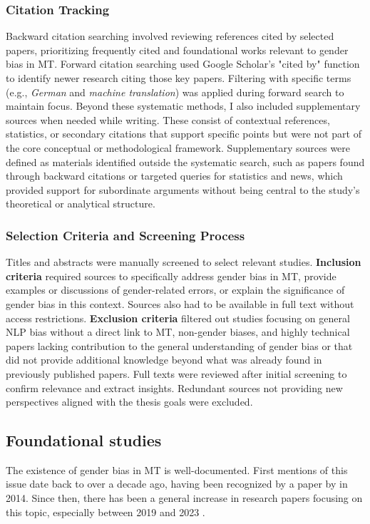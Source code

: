         \subsubsection{Citation Tracking}
        Backward citation searching involved reviewing references cited by selected papers, prioritizing frequently cited and foundational works relevant to gender bias in MT. Forward citation searching used Google Scholar's "cited by" function to identify newer research citing those key papers. Filtering with specific terms (e.g., \textit{German} and \textit{machine translation}) was applied during forward search to maintain focus. Beyond these systematic methods, I also included supplementary sources when needed while writing. These consist of contextual references, statistics, or secondary citations that support specific points but were not part of the core conceptual or methodological framework. Supplementary sources were defined as materials identified outside the systematic search, such as papers found through backward citations or targeted queries for statistics and news, which provided support for subordinate arguments without being central to the study's theoretical or analytical structure.

        \subsubsection{Selection Criteria and Screening Process}\label{subsection:selection_criteria}
        Titles and abstracts were manually screened to select relevant studies. \textbf{Inclusion criteria} required sources to specifically address gender bias in MT, provide examples or discussions of gender-related errors, or explain the significance of gender bias in this context. Sources also had to be available in full text without access restrictions. \textbf{Exclusion criteria} filtered out studies focusing on general NLP bias without a direct link to MT, non-gender biases, and highly technical papers lacking contribution to the general understanding of gender bias or that did not provide additional knowledge beyond what was already found in previously published papers. Full texts were reviewed after initial screening to confirm relevance and extract insights. Redundant sources not providing new perspectives aligned with the thesis goals were excluded.

    \subsection{Foundational studies}
        The existence of gender bias in MT is well-documented. First mentions of this issue date back to over a decade ago, having been recognized by a paper by \citeauthor{schiebingerScientificResearchMust2014} in 2014. Since then, there has been a general increase in research papers focusing on this topic, especially between 2019 and 2023 \citep{savoldiDecadeGenderBias2025}. 

